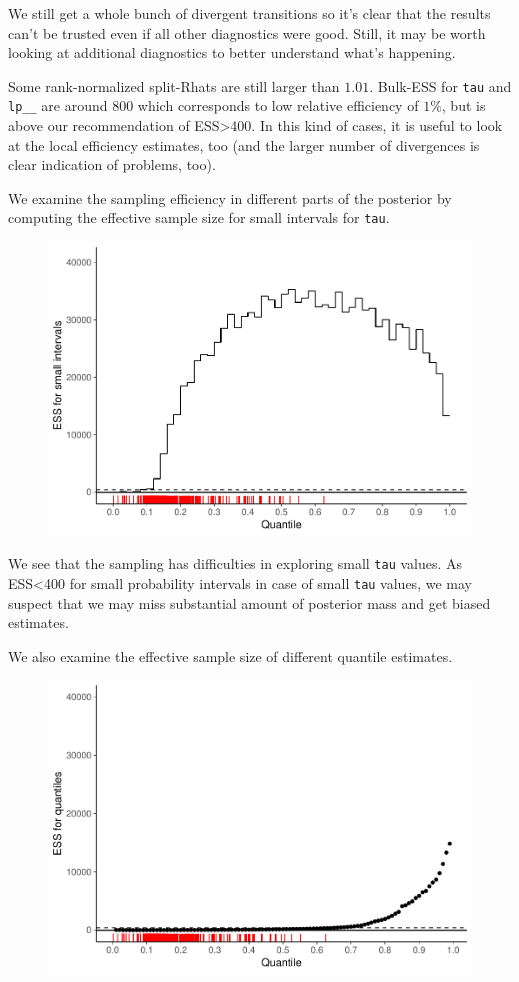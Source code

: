 \documentclass[american,]{article}
\begin{document}
We still get a whole bunch of divergent transitions so it's clear that
the results can't be trusted even if all other diagnostics were good.
Still, it may be worth looking at additional diagnostics to better
understand what's happening.

Some rank-normalized split-Rhats are still larger than \(1.01\).
Bulk-ESS for \texttt{tau} and \texttt{lp\_\_} are around 800 which
corresponds to low relative efficiency of \(1\%\), but is above our
recommendation of ESS\textgreater{}400. In this kind of cases, it is
useful to look at the local efficiency estimates, too (and the larger
number of divergences is clear indication of problems, too).

We examine the sampling efficiency in different parts of the posterior
by computing the effective sample size for small intervals for
\texttt{tau}.

\begin{figure}[t]
  \centering
  \includegraphics[width=0.6\linewidth]{graphics/local-ess-fit-cp2-tau-1.pdf}
\end{figure}

We see that the sampling has difficulties in exploring small
\texttt{tau} values. As ESS\textless{}400 for small probability
intervals in case of small \texttt{tau} values, we may suspect that we
may miss substantial amount of posterior mass and get biased estimates.

We also examine the effective sample size of different quantile
estimates.

\begin{figure}[t]
  \centering
  \includegraphics[width=0.6\linewidth]{graphics/quantile-ess-fit-cp2-tau-1.pdf}
\end{figure}
\end{document}
